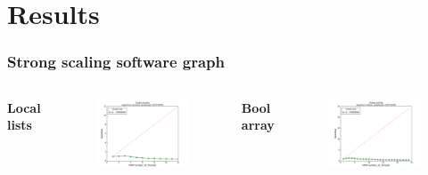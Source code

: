 \section{Results}

\begin{frame}
\frametitle{Strong scaling software graph}
\begin{columns}[T]
  \bfseries{Local lists}
  \begin{figure}[!ht]
    \begin{center}
      \includegraphics[width=\textwidth]{img/strongscaling_locallist_gtSOFTWARE_opt0.pdf}
    \end{center}
  \end{figure}
  \bfseries{Bool array}
  \begin{figure}[!ht]
    \begin{center}
      \includegraphics[width=\textwidth]{img/strongscaling_bitset_gtSOFTWARE_opt1.pdf}
    \end{center}
  \end{figure}  
\end{columns}


\end{frame}
